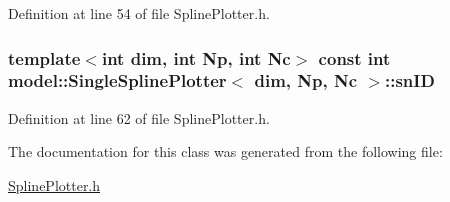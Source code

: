 Definition at line 54 of file Spline\+Plotter.\+h.

\hypertarget{classmodel_1_1_single_spline_plotter_ae255b98f097fad73ff25f224c491b6fc}{}
\subsubsection[{sn\+I\+D}]{\setlength{\rightskip}{0pt plus 5cm}template$<$int dim, int Np, int Nc$>$ const int {\bf model\+::\+Single\+Spline\+Plotter}$<$ {\bf dim}, Np, {\bf Nc} $>$\+::sn\+I\+D}\label{classmodel_1_1_single_spline_plotter_ae255b98f097fad73ff25f224c491b6fc}


Definition at line 62 of file Spline\+Plotter.\+h.



The documentation for this class was generated from the following file\+:\begin{DoxyCompactItemize}
\item 
\hyperlink{_spline_plotter_8h}{Spline\+Plotter.\+h}\end{DoxyCompactItemize}
